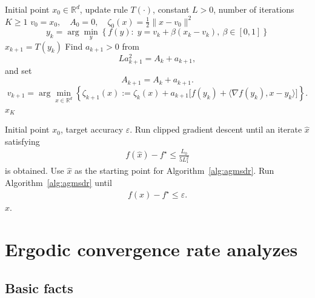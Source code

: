 \documentclass[runningheads]{llncs}
\begin{document}
	\begin{algorithm}[H]
		\caption{AGMsDR$(x_0,T(\cdot),L,K)$ \cite{nesterov2021primal}}
		\label{alg:agmsdr}
		\begin{algorithmic}[1]
			\Require Initial point $x_0 \in \mathbb{R}^d$, update rule $T(\cdot)$, constant $L>0$, number of iterations $K\ge1$
			\State $v_0=x_0,\quad A_0=0,\quad \zeta_0(x)=\frac12\|x-v_0\|^2$
			\State
			\[
			y_k=\arg\min_{y}\left\{f(y):\; y=v_k+\beta(x_k-v_k),\ \beta\in[0,1]\right\}
			\]
			\State $x_{k+1}=T(y_k)$ 
			\State Find $a_{k+1}>0$ from
			\[
			La_{k+1}^2=A_k+a_{k+1},
			\]
			and set
			\[
			A_{k+1}=A_k+a_{k+1}.
			\]
			\State
			\[
			v_{k+1}
			=
			\arg\min_{x\in\mathbb{R}^d}
			\left\{
			\zeta_{k+1}(x)
			:=
			\zeta_k(x)
			+
			a_{k+1}
			\bigl[
			f(y_k)
			+
			\langle\nabla f(y_k),x-y_k\rangle
			\bigr]
			\right\}.
			\]
			\EndFor
			\State \Return $x_K$
		\end{algorithmic}
	\end{algorithm}
	
	\begin{algorithm}[t]
		\caption{Two-Stage Acceleration Procedure (\cite{vankov2025optimizing}, Algorithm 6.2)}
		\label{alg:two_stage}
		\begin{algorithmic}[1]
			\Require Initial point $x_0$, target accuracy $\varepsilon$.
			\State Run clipped gradient descent until an iterate $\hat{x}$ satisfying
			\begin{align*}
				f(\hat{x})-f^\star \leq \frac{L_0}{5 L_1^2}
			\end{align*}
			is obtained.
			\State Use $\hat{x}$ as the starting point for Algorithm~\eqref{alg:agmsdr}.
			\State Run Algorithm~\eqref{alg:agmsdr} until
			\begin{align*}
				f(x)-f^\star \leq \varepsilon .
			\end{align*}
			\Return $x$.
		\end{algorithmic}
	\end{algorithm}
	
	\section{Ergodic convergence rate analyzes}\label{sect:erg_conv_rate_analyzes}

	\subsection{Basic facts}
	
\end{document}
